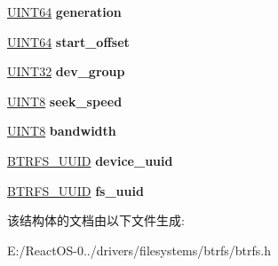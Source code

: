 \begin{DoxyCompactItemize}
\item 
\mbox{\label{struct_d_e_v___i_t_e_m_a7dd282998c4eca0d2bcb31be81209476}} 
\hyperlink{_processor_bind_8h_a57be03562867144161c1bfee95ca8f7c}{U\+I\+N\+T64} {\bfseries generation}
\item 
\mbox{\label{struct_d_e_v___i_t_e_m_ab98d7111b1906fffea688fe26b6cac7d}} 
\hyperlink{_processor_bind_8h_a57be03562867144161c1bfee95ca8f7c}{U\+I\+N\+T64} {\bfseries start\+\_\+offset}
\item 
\mbox{\label{struct_d_e_v___i_t_e_m_ac963070f7aa0ff982c2b5c62787c094a}} 
\hyperlink{_processor_bind_8h_ae1e6edbbc26d6fbc71a90190d0266018}{U\+I\+N\+T32} {\bfseries dev\+\_\+group}
\item 
\mbox{\label{struct_d_e_v___i_t_e_m_a05a235d2b74bd05eaeb2aafaefca3feb}} 
\hyperlink{_processor_bind_8h_ab27e9918b538ce9d8ca692479b375b6a}{U\+I\+N\+T8} {\bfseries seek\+\_\+speed}
\item 
\mbox{\label{struct_d_e_v___i_t_e_m_a07ec36091c2420dd6ddc34622c56ffc5}} 
\hyperlink{_processor_bind_8h_ab27e9918b538ce9d8ca692479b375b6a}{U\+I\+N\+T8} {\bfseries bandwidth}
\item 
\mbox{\label{struct_d_e_v___i_t_e_m_ad7ec0143fbc8edafdc0d3febad0f1e3f}} 
\hyperlink{struct_b_t_r_f_s___u_u_i_d}{B\+T\+R\+F\+S\+\_\+\+U\+U\+ID} {\bfseries device\+\_\+uuid}
\item 
\mbox{\label{struct_d_e_v___i_t_e_m_af9820afe58b420c77b0164e0327da0ad}} 
\hyperlink{struct_b_t_r_f_s___u_u_i_d}{B\+T\+R\+F\+S\+\_\+\+U\+U\+ID} {\bfseries fs\+\_\+uuid}
\end{DoxyCompactItemize}


该结构体的文档由以下文件生成\+:\begin{DoxyCompactItemize}
\item 
E\+:/\+React\+O\+S-\/0../drivers/filesystems/btrfs/btrfs.\+h\end{DoxyCompactItemize}
